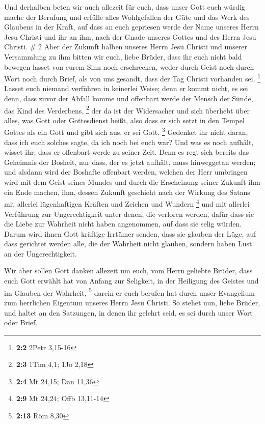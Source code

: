  Und derhalben beten wir auch allezeit für euch, dass unser
Gott euch würdig mache der Berufung und erfülle alles Wohlgefallen der
Güte und das Werk des Glaubens in der Kraft,  auf dass an
euch gepriesen werde der Name unseres Herrn Jesu Christi und ihr an ihm,
nach der Gnade unseres Gottes und des Herrn Jesu Christi. \# 2
 Aber der Zukunft halben unseres Herrn Jesu Christi und
unserer Versammlung zu ihm bitten wir euch, liebe Brüder, 
dass ihr euch nicht bald bewegen lasset von eurem Sinn noch erschrecken,
weder durch Geist noch durch Wort noch durch Brief, als von uns gesandt,
dass der Tag Christi vorhanden sei. \footnote{\textbf{2:2} 2Petr 3,15-16}
 Lasset euch niemand verführen in keinerlei Weise; denn er
kommt nicht, es sei denn, dass zuvor der Abfall komme und offenbart
werde der Mensch der Sünde, das Kind des Verderbens, \footnote{\textbf{2:3}
  1Tim 4,1; 1Jo 2,18}  der da ist der Widersacher und sich
überhebt über alles, was Gott oder Gottesdienst heißt, also dass er sich
setzt in den Tempel Gottes als ein Gott und gibt sich aus, er sei Gott.
\footnote{\textbf{2:4} Mt 24,15; Dan 11,36}  Gedenket ihr
nicht daran, dass ich euch solches sagte, da ich noch bei euch war?
 Und was es noch aufhält, wisset ihr, dass er offenbart
werde zu seiner Zeit.  Denn es regt sich bereits das
Geheimnis der Bosheit, nur dass, der es jetzt aufhält, muss hinweggetan
werden;  und alsdann wird der Boshafte offenbart werden,
welchen der Herr umbringen wird mit dem Geist seines Mundes und durch
die Erscheinung seiner Zukunft ihm ein Ende machen,  ihm,
dessen Zukunft geschieht nach der Wirkung des Satans mit allerlei
lügenhaftigen Kräften und Zeichen und Wundern \footnote{\textbf{2:9} Mt
  24,24; Offb 13,11-14}  und mit allerlei Verführung zur
Ungerechtigkeit unter denen, die verloren werden, dafür dass sie die
Liebe zur Wahrheit nicht haben angenommen, auf dass sie selig würden.
 Darum wird ihnen Gott kräftige Irrtümer senden, dass sie
glauben der Lüge,  auf dass gerichtet werden alle, die der
Wahrheit nicht glauben, sondern haben Lust an der Ungerechtigkeit.

 Wir aber sollen Gott danken allezeit um euch, vom Herrn
geliebte Brüder, dass euch Gott erwählt hat von Anfang zur Seligkeit, in
der Heiligung des Geistes und im Glauben der Wahrheit, \footnote{\textbf{2:13}
  Röm 8,30}  darein er euch berufen hat durch unser
Evangelium zum herrlichen Eigentum unseres Herrn Jesu Christi.
 So stehet nun, liebe Brüder, und haltet an den Satzungen,
in denen ihr gelehrt seid, es sei durch unser Wort oder Brief.

